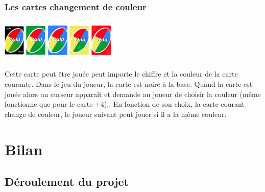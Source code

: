 \documentclass[french]{article}
\begin{document}
\subsubsection{Les cartes changement de couleur}
\begin{center}
	\centering
	\includegraphics[width=1cm, height=2cm]{11n}
	\includegraphics[width=1cm, height=2cm]{11v}
	\includegraphics[width=1cm, height=2cm]{11b}
	\includegraphics[width=1cm, height=2cm]{11j}
	\includegraphics[width=1cm, height=2cm]{11r}
\end{center}
Cette carte peut être jouée peut importe le chiffre et la couleur de la carte courante.
Dans le jeu du joueur, la carte est noire à la base. Quand la carte est jouée alors un curseur apparaît et demande au joueur de choisir la couleur (même fonctionne que pour le carte +4).. En fonction de son choix, la carte courant change de couleur, le joueur suivant peut jouer si il a la même couleur.

\section{Bilan}
\subsection{Déroulement du projet}
\end{document}
